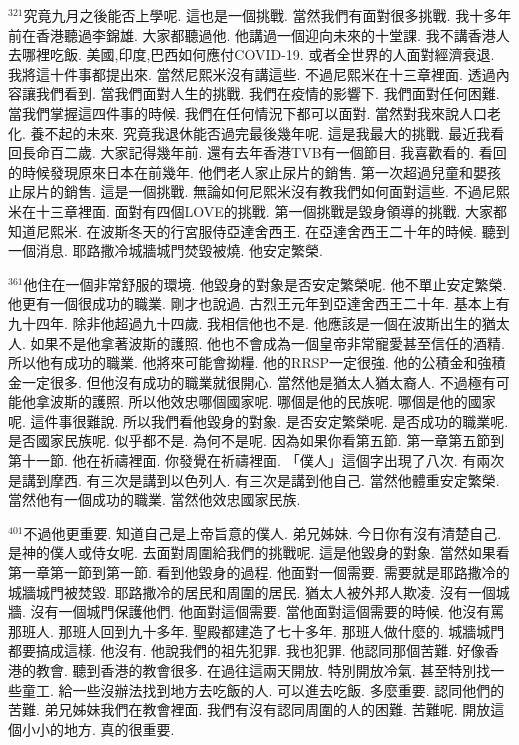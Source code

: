 \documentclass{book}
\begin{document}
$^{321}$究竟九月之後能否上學呢.
這也是一個挑戰.
當然我們有面對很多挑戰.
我十多年前在香港聽過李錦雄.
大家都聽過他.
他講過一個迎向未來的十堂課.
我不講香港人去哪裡吃飯.
美國,印度,巴西如何應付COVID-19.
或者全世界的人面對經濟衰退.
我將這十件事都提出來.
當然尼熙米沒有講這些.
不過尼熙米在十三章裡面.
透過內容讓我們看到.
當我們面對人生的挑戰.
我們在疫情的影響下.
我們面對任何困難.
當我們掌握這四件事的時候.
我們在任何情況下都可以面對.
當然對我來說人口老化.
養不起的未來.
究竟我退休能否過完最後幾年呢.
這是我最大的挑戰.
最近我看回長命百二歲.
大家記得幾年前.
還有去年香港TVB有一個節目.
我喜歡看的.
看回的時候發現原來日本在前幾年.
他們老人家止尿片的銷售.
第一次超過兒童和嬰孩止尿片的銷售.
這是一個挑戰.
無論如何尼熙米沒有教我們如何面對這些.
不過尼熙米在十三章裡面.
面對有四個LOVE的挑戰.
第一個挑戰是毀身領導的挑戰.
大家都知道尼熙米.
在波斯冬天的行宮服侍亞達舍西王.
在亞達舍西王二十年的時候.
聽到一個消息.
耶路撒冷城牆城門焚毀被燒.
他安定繁榮.

$^{361}$他住在一個非常舒服的環境.
他毀身的對象是否安定繁榮呢.
他不單止安定繁榮.
他更有一個很成功的職業.
剛才也說過.
古烈王元年到亞達舍西王二十年.
基本上有九十四年.
除非他超過九十四歲.
我相信他也不是.
他應該是一個在波斯出生的猶太人.
如果不是他拿著波斯的護照.
他也不會成為一個皇帝非常寵愛甚至信任的酒精.
所以他有成功的職業.
他將來可能會拗糧.
他的RRSP一定很強.
他的公積金和強積金一定很多.
但他沒有成功的職業就很開心.
當然他是猶太人猶太裔人.
不過極有可能他拿波斯的護照.
所以他效忠哪個國家呢.
哪個是他的民族呢.
哪個是他的國家呢.
這件事很難說.
所以我們看他毀身的對象.
是否安定繁榮呢.
是否成功的職業呢.
是否國家民族呢.
似乎都不是.
為何不是呢.
因為如果你看第五節.
第一章第五節到第十一節.
他在祈禱裡面.
你發覺在祈禱裡面.
「僕人」這個字出現了八次.
有兩次是講到摩西.
有三次是講到以色列人.
有三次是講到他自己.
當然他體重安定繁榮.
當然他有一個成功的職業.
當然他效忠國家民族.

$^{401}$不過他更重要.
知道自己是上帝旨意的僕人.
弟兄姊妹.
今日你有沒有清楚自己.
是神的僕人或侍女呢.
去面對周圍給我們的挑戰呢.
這是他毀身的對象.
當然如果看第一章第一節到第一節.
看到他毀身的過程.
他面對一個需要.
需要就是耶路撒冷的城牆城門被焚毀.
耶路撒冷的居民和周圍的居民.
猶太人被外邦人欺凌.
沒有一個城牆.
沒有一個城門保護他們.
他面對這個需要.
當他面對這個需要的時候.
他沒有罵那班人.
那班人回到九十多年.
聖殿都建造了七十多年.
那班人做什麼的.
城牆城門都要搞成這樣.
他沒有.
他說我們的祖先犯罪.
我也犯罪.
他認同那個苦難.
好像香港的教會.
聽到香港的教會很多.
在過往這兩天開放.
特別開放冷氣.
甚至特別找一些童工.
給一些沒辦法找到地方去吃飯的人.
可以進去吃飯.
多麼重要.
認同他們的苦難.
弟兄姊妹我們在教會裡面.
我們有沒有認同周圍的人的困難.
苦難呢.
開放這個小小的地方.
真的很重要.
\end{document}
